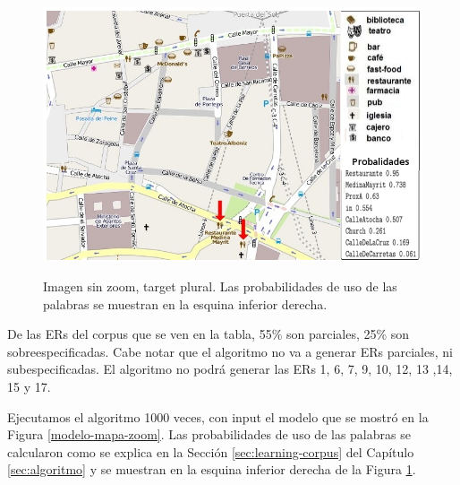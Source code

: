 \begin{figure}[h]
\centering
\includegraphics[width=\textwidth]{images/corpus/mapa10conProb.png}\\[0pt]
\caption{Imagen sin zoom, target plural. Las probabilidades de uso de las palabras se muestran en la esquina inferior derecha.}
\label{mapa-zoom-plural}
\end{figure}

De las ERs del corpus que se ven en la tabla, 55\% son parciales, 25\% son sobreespecificadas. Cabe notar que el algoritmo no va a generar ERs parciales, ni subespecificadas. El algoritmo no podr\'a generar las ERs 1, 6, 7, 9, 10, 12, 13 ,14, 15 y 17. 

Ejecutamos el algoritmo 1000 veces, con input el modelo que se mostr\'o en la Figura \ref{modelo-mapa-zoom}. Las probabilidades de uso de las palabras se calcularon como se explica en la Secci\'on \ref{sec:learning-corpus} del Cap\'itulo \ref{sec:algoritmo} y se muestran en la esquina inferior derecha de la Figura \ref{mapa-zoom-plural}. 


